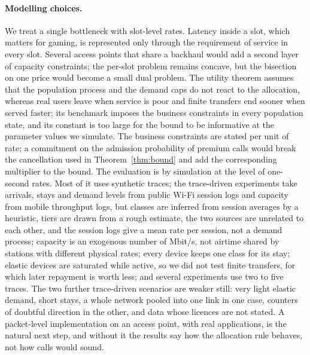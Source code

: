 \paragraph{Modelling choices.}
We treat a single bottleneck with slot-level rates.
Latency inside a slot, which matters for gaming, is represented only through the requirement of service in every slot.
Several access points that share a backhaul would add a second layer of capacity constraints; the per-slot problem remains concave, but the bisection on one price would become a small dual problem.
The utility theorem assumes that the population process and the demand caps do not react to the allocation, whereas real users leave when service is poor and finite transfers end sooner when served faster; its benchmark imposes the business constraints in every population state, and its constant is too large for the bound to be informative at the parameter values we simulate.
The business constraints are stated per unit of rate; a commitment on the admission probability of premium calls would break the cancellation used in Theorem~\ref{thm:bound} and add the corresponding multiplier to the bound.
The evaluation is by simulation at the level of one-second rates. Most of it uses synthetic traces; the trace-driven experiments take arrivals, stays and demand levels from public Wi-Fi session logs and capacity from mobile throughput logs, but classes are inferred from session averages by a heuristic, tiers are drawn from a rough estimate, the two sources are unrelated to each other, and the session logs give a mean rate per session, not a demand process; capacity is an exogenous number of Mbit/s, not airtime shared by stations with different physical rates; every device keeps one class for its stay; elastic devices are saturated while active, so we did not test finite transfers, for which later repayment is worth less; and several experiments use two to five traces. The two further trace-driven scenarios are weaker still: very light elastic demand, short stays, a whole network pooled into one link in one case, counters of doubtful direction in the other, and data whose licences are not stated. A packet-level implementation on an access point, with real applications, is the natural next step, and without it the results say how the allocation rule behaves, not how calls would sound.
